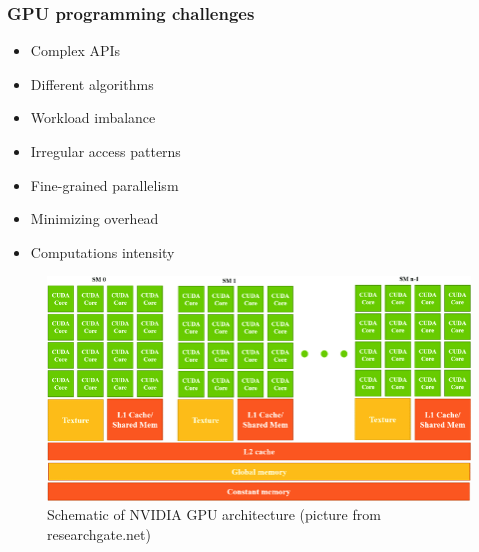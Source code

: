 \documentclass[aspectratio=169,xcolor=table,english]{beamer}
\begin{document}
\begin{frame}[fragile] \frametitle{GPU programming challenges}
    \begin{minipage}[m]{0.5\linewidth}
        \begin{itemize}
            \item Complex APIs
            \item Different algorithms
            \item Workload imbalance
            \item Irregular access patterns
            \item Fine-grained parallelism
            \item Minimizing overhead
            \item Computations intensity
        \end{itemize}
    \end{minipage}\hfill
    \begin{minipage}[m]{0.45\linewidth}
        \begin{figure}
            \centering
            \includegraphics[width=\textwidth]{figures/cuda_gpu_architecture.png}
            \caption{Schematic of NVIDIA GPU architecture (picture from researchgate.net)}
            \label{fig:cuda}
        \end{figure}
    \end{minipage}
\end{frame}
\end{document}

